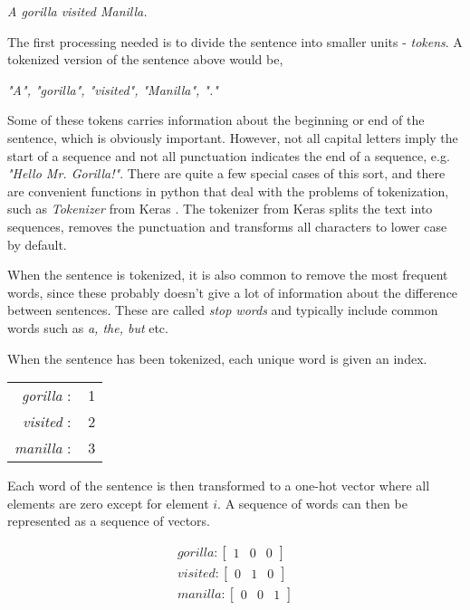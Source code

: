 \begin{center}
    \textit{A gorilla visited Manilla.}    
\end{center}

The first processing needed is to divide the sentence into smaller units - \textit{tokens}. A tokenized version of the sentence above would be,

\begin{center}
    \textit{"A", "gorilla", "visited", "Manilla", "."}    
\end{center}

Some of these tokens carries information about the beginning or end of the sentence, which is obviously important. However, not all capital letters imply the start of a sequence and not all punctuation indicates the end of a sequence, e.g. \textit{"Hello Mr. Gorilla!"}. There are quite a few special cases of this sort, and there are convenient functions in python that deal with the problems of tokenization, such as \textit{Tokenizer} from Keras \citep{chollet2020keras}. The tokenizer from Keras splits the text into sequences, removes the punctuation and transforms all characters to lower case by default. 

When the sentence is tokenized, it is also common to remove the most frequent words, since these probably doesn't give a lot of information about the difference between sentences. These are called \textit{stop words} and typically include common words such as \textit{a, the, but} etc.

When the sentence has been tokenized, each unique word is given an index. 

\begin{center}
    \begin{tabular}{rc}
        \textit{gorilla} $:$ & 1 \\
        \textit{visited} $:$ & 2 \\
        \textit{manilla} $:$ & 3 \\
    \end{tabular}
\end{center}

Each word of the sentence is then transformed to a one-hot vector where all elements are zero except for element $i$. A sequence of words can then be represented as a sequence of vectors. 

\begin{align*}
    \textit{gorilla} : \begin{bmatrix}
    1 & 0 & 0 
    \end{bmatrix} \\
    \textit{visited} : \begin{bmatrix}
    0 & 1 & 0 
    \end{bmatrix} \\
    \textit{manilla} : \begin{bmatrix}
    0 & 0 & 1 
    \end{bmatrix} \\
\end{align*}


